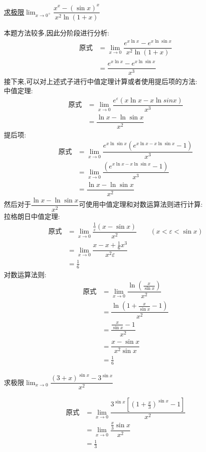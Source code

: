 \documentclass[8pt a4paper, oneside, UTF8]{ctexbook}
\begin{document}
\begin{sloppypar}
\begin{solution}
    \end{solution}
    \begin{problem}
        \uline{求极限}$\lim_{x\to0^+}\dfrac{x^x-(\sin x)^x}{x^2\ln(1+x)}$
    \end{problem}
    \begin{solution}
        本题方法较多,因此分阶段进行分析:
        \begin{align*}
          \text{原式} & =\lim_{x\to0} \dfrac{e^{x \ln x}-e^{x \ln \sin x} }{x^2\ln(1+x)}\\
          & = \dfrac{e^{x \ln x}-e^{x \ln \sin x}}{x^3}
        \end{align*}
    接下来,可以对上述式子进行中值定理计算或者使用提后项的方法:\\
    中值定理:
    \begin{align*}
      \text{原式} & =\lim_{x\to0} \dfrac{e^{\varepsilon}(x\ln x- x\ln sin x)}{x^3}   \\
      & =  \dfrac{\ln x -\ln \sin x}{x^2}
    \end{align*}
    提后项:
    \begin{align*}
      \text{原式} & =\lim_{x\to0} \dfrac{e^{x\ln \sin x}(e^{x\ln x-x \ln \sin x}-1)}{x^3} \\
      & =   \lim_{x\to0} \dfrac{(e^{x\ln x-x \ln \sin x}-1)}{x^3}\\
      & =  \dfrac{\ln x -\ln \sin x}{x^2}
    \end{align*}
    然后对于$\dfrac{\ln x -\ln \sin x}{x^2}$可使用中值定理和对数运算法则进行计算:\\
    拉格朗日中值定理:
    \begin{align*}
      \text{原式} & = \lim_{x \to 0}\dfrac{\frac{1}{\varepsilon}(x-\sin x)}{x^2} \qquad(x<\varepsilon < \sin x) \\
      & =\lim_{x \to 0} \dfrac{x-x+\frac{1}{6}x^3}{x^2 \varepsilon}\\ 
      & = \frac{1}{6}
    \end{align*}
    对数运算法则:
    \begin{align*}
      \text{原式} & =\lim_{x \to 0} \dfrac{\ln (\frac{x}{\sin x})}{x^2}\\
      & =  \dfrac{\ln(1+\frac{x}{\sin x}-1)}{x^2}\\
      & = \dfrac{\frac{x}{\sin x}-1}{x^2}\\
      & = \dfrac{x-\sin x}{x^2\sin x}\\
      &= \frac{1}{6}
    \end{align*}
    \end{solution}
    \begin{problem}
        求极限$\lim_{x\to 0}\dfrac{(3+x)^{\sin x} -3^{\sin x}}{x^2}$
    \end{problem}
    \begin{solution}
        \begin{align*}
          \text{原式} & = \lim_{x\to 0} \dfrac{3^{\sin x}[(1+\frac{x}{3})^{\sin x} -1]}{x^2} \\
          & =  \lim_{x\to 0}\dfrac{\frac{x}{3}\sin x}{x^2} \\
          & = \frac{1}{3}
        \end{align*}
    \end{solution}

\end{sloppypar}
\end{document}
